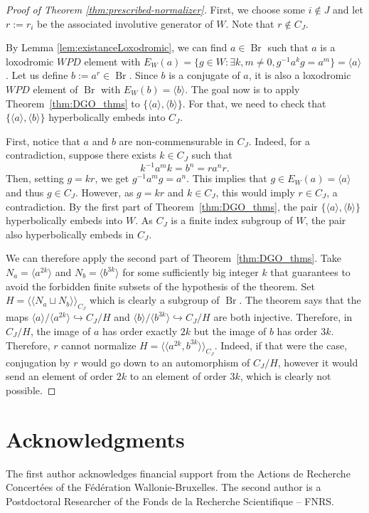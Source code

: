 \documentclass[10pt,a4paper]{amsart}
\newcommand{\Br}{\operatorname{Br}}
\begin{document}
\begin{proof}[Proof of Theorem \ref{thm:prescribed-normalizer}]
First, we choose some $i \notin J$ and let $r := r_i$ be the associated involutive generator of $W$. Note that $r \notin C_J$. 

By Lemma \ref{lem:existanceLoxodromic}, we can find $a\in \Br$ such that $a$ is a loxodromic $WPD$ element with $E_W(a) = \{g \in W : \exists k,m \neq 0 , g^{-1} a^k g = a^m \} = \langle a \rangle $. Let us define $b := a^r \in \Br$. Since $b$ is a conjugate of $a$, it is also a loxodromic $WPD$ element of $\Br$ with $E_W(b) = \langle b \rangle$. The goal now is to apply Theorem~\ref{thm:DGO_thms} to $\{\langle a\rangle, \langle b\rangle\}$. For that, we need to check that $\{\langle a\rangle, \langle b\rangle\}$ hyperbolically embeds into $C_J$.

First, notice that $a$ and $b$ are non-commensurable in $C_J$. Indeed, for a contradiction, suppose there exists $k \in C_J$ such that 
$$
k^{-1}a^m k = b^n =ra^nr.
$$
Then, setting $g = kr$, we get $g^{-1} a^m g  = a^n$. This implies that $g \in E_W(a) = \langle a \rangle$ and thus $g \in C_J$. However, as $g = kr$ and $k \in C_J$, this would imply $r \in C_J$, a contradiction. 
By the first part of Theorem~\ref{thm:DGO_thms}, the pair $\{\langle a \rangle, \langle b \rangle \}$ hyperbolically embeds into $W$. As $C_J$ is a finite index subgroup of $W$, the pair also hyperbolically embeds in $C_J$.

We can therefore apply the second part of Theorem~\ref{thm:DGO_thms}. Take $N_a = \langle a^{2k} \rangle$ and $N_b = \langle b^{3k} \rangle$ for some sufficiently big integer $k$ that guarantees to avoid the forbidden finite subsets of the hypothesis of the theorem.
Set $H = \langle\langle N_a \sqcup N_b\rangle \rangle_{C_J}$ which is clearly a subgroup of $\Br$. The theorem says that the maps $\langle a \rangle/ \langle a^{2k} \rangle \hookrightarrow C_J / H$ and $\langle b \rangle/ \langle b^{3k} \rangle \hookrightarrow C_J / H$ are both injective. Therefore, in $C_J / H$, the image of $a$ has order exactly $2k$ but the image of $b$ has order $3k$. Therefore, $r$ cannot normalize $H = \langle\langle a^{2k},b^{3k}\rangle\rangle_{C_J}$. Indeed, if that were the case, conjugation by $r$ would go down to an automorphism of $C_J / H$, however it would send an element of order $2k$ to an element of order $3k$, which is clearly not possible.
\end{proof}


\section*{Acknowledgments}
The first author acknowledges financial support from the Actions de Recherche Concertées of the Fédération Wallonie-Bruxelles. The second author is a Postdoctoral Researcher of the Fonds de la Recherche Scientifique -- FNRS.
\end{document}
